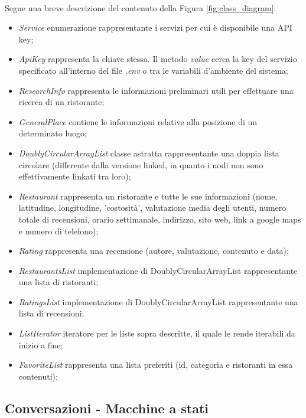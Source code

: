 \documentclass[a4paper, 12pt]{article}
\begin{document}
	\paragraph{}
	Segue una breve descrizione del contenuto della Figura \ref{fig:class_diagram}:
	\begin{itemize}
		\item \textit{Service} enumerazione rappresentante i servizi per cui è disponibile una API key;
		\item \textit{ApiKey} rappresenta la chiave stessa. Il metodo \textit{value} cerca la key del servizio specificato all'interno del file \textit{.env} o tra le variabili d'ambiente del sistema;
		\item \textit{ResearchInfo} rappresenta le informazioni preliminari utili per effettuare una ricerca di un ristorante;
		\item \textit{GeneralPlace} contiene le informazioni relative alla posizione di un determinato luogo;
		\item \textit{DoublyCircularArrayList} classe astratta rappresentante una doppia lista circolare\cite{circularDoublyLinkedList} (differente dalla versione linked, in quanto i nodi non sono effettivamente linkati tra loro);
		\item \textit{Restaurant} rappresenta un ristorante e tutte le sue informazioni (nome, latitudine, longitudine, 'costosità', valutazione media degli utenti, numero totale di recensioni, orario settimanale, indirizzo, sito web, link a google maps e numero di telefono);
		\item \textit{Rating} rappresenta una recensione (autore, valutazione, contenuto e data);
		\item \textit{RestaurantsList} implementazione di DoublyCircularArrayList rappresentante una lista di ristoranti;
		\item \textit{RatingsList} implementazione di DoublyCircularArrayList rappresentante una lista di recensioni;
		\item \textit{ListIterator} iteratore per le liste sopra descritte, il quale le rende iterabili da inizio a fine;
		\item \textit{FavoriteList} rappresenta una lista preferiti (id, categoria e ristoranti in essa contenuti);
	\end{itemize}

	\subsection{Conversazioni - Macchine a stati}
\end{document}
